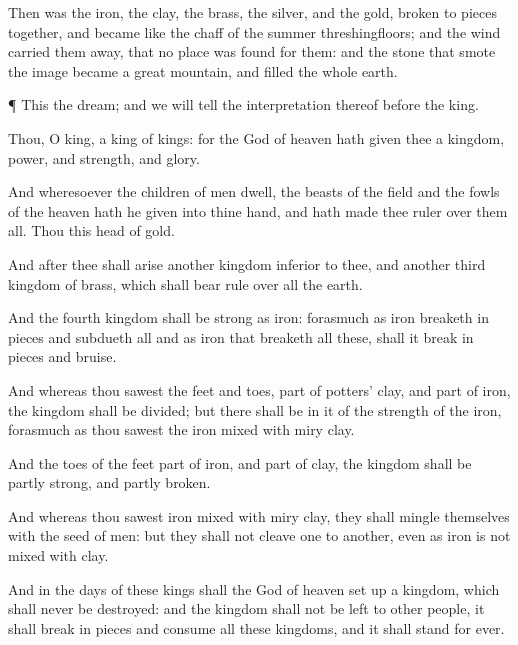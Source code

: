 {Then was the
iron, the
clay, the
brass, the
silver, and the
gold, broken to
pieces
together, and
became like the
chaff
of the
summer
threshingfloors; and the
wind
carried
them
away,
that
no
place was
found for them: and the
stone that
smote the
image
became a
great
mountain, and
filled the
whole
earth.


\par }{\PP {}¶
This
{} the
dream; and we will
tell the
interpretation thereof
before the
king.

Thou, O
king,
{} a
king of
kings: for the
God of
heaven hath
given thee a
kingdom,
power, and
strength, and
glory.

And
wheresoever the
children of
men
dwell, the
beasts of the
field and the
fowls of the
heaven hath he
given into thine
hand, and hath made thee
ruler over them
all.
Thou
{} this
head of
gold.

And
after thee shall
arise
another
kingdom
inferior to
thee, and
another
third
kingdom of
brass, which shall bear
rule over
all the
earth.

And the
fourth
kingdom shall
be
strong as
iron: forasmuch as
iron breaketh in
pieces and
subdueth
all
{} and
as
iron that
breaketh
all
these, shall it break in
pieces and
bruise.

And whereas thou
sawest the
feet and
toes,
part of
potters’
clay, and
part of
iron, the
kingdom shall
be
divided;
but there shall
be in it
of the
strength of the
iron, forasmuch
as thou
sawest the
iron
mixed with
miry
clay.

And
{} the
toes of the
feet
{}
part of
iron, and
part of
clay,
{} the
kingdom shall
be
partly
strong, and
partly
broken.

And
whereas thou
sawest
iron
mixed with
miry
clay, they shall mingle
themselves with the
seed of
men: but they
shall
not
cleave
one
to
another,
even as
iron is
not
mixed with
clay.

And in the
days of
these
kings shall the
God of
heaven set
up a
kingdom, which shall
never be
destroyed: and the
kingdom shall
not be
left to
other
people,
{} it shall break in
pieces and
consume
all
these
kingdoms, and
it shall
stand for
ever.

}
